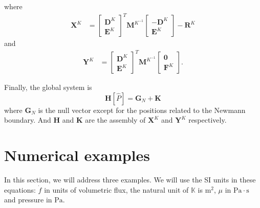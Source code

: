 \documentclass[review]{elsarticle}
\begin{document}
where 
\begin{align*}
\textbf{X}^K &= \left[\begin{array}{c}
\textbf{D}^K \\ \textbf{E}^K
\end{array} \right]^T 
\textbf{M}^{K^{-1}}\left[\begin{array}{c}
-\textbf{D}^K  \\ 
\textbf{E}^K 
\end{array} \right] - \textbf{R}^K 
\end{align*}
and
\begin{align*}
\textbf{Y}^K &= \left[\begin{array}{c}
\textbf{D}^K \\ \textbf{E}^K
\end{array} \right]^T   \textbf{M}^{K^{-1}} 
\left[\begin{array}{c}
\textbf{0}  \\ 
\textbf{F}^K 
\end{array} \right].
\end{align*}

Finally, the global system is
\begin{equation}\label{sistemaEqhdg2}
\textbf{H}[\hat{P}] = \textbf{G}_N + \textbf{K} 
\end{equation}
where $\textbf{G}_N$ is the null vector except for the positions related to the Newmann boundary. And $\textbf{H}$ and $\textbf{K}$ are the assembly of  $\textbf{X}^K$ and $\textbf{Y}^K$ respectively. 

\section{Numerical examples}

In this section, we will address three examples. We will use the SI units in these equations: $\dot{f}$ in units of volumetric flux, the natural unit of $\mathbb{K}$ is  $\mathrm{m^2}$, $\mu$ in $\mathrm{Pa}\cdot\mathrm{s}$ and  pressure in $\mathrm{Pa}$. 
\end{document}
